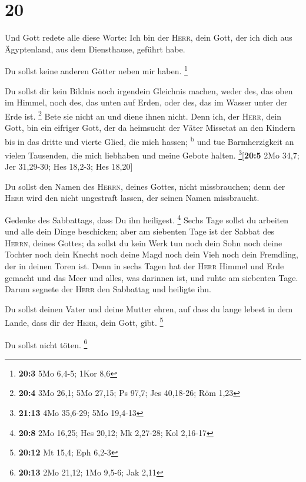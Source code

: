 \hypertarget{section-19}{%
\section{20}\label{section-19}}

 Und Gott redete alle diese Worte:  Ich bin
der \textsc{Herr}, dein Gott, der ich dich aus Ägyptenland, aus dem
Diensthause, geführt habe.

 Du sollst keine anderen Götter neben mir haben.
\footnote{\textbf{20:3} 5Mo 6,4-5; 1Kor 8,6}

 Du sollst dir kein Bildnis noch irgendein Gleichnis
machen, weder des, das oben im Himmel, noch des, das unten auf Erden,
oder des, das im Wasser unter der Erde ist. \footnote{\textbf{20:4} 3Mo
  26,1; 5Mo 27,15; Ps 97,7; Jes 40,18-26; Röm 1,23}  Bete
sie nicht an und diene ihnen nicht. Denn ich, der \textsc{Herr}, dein
Gott, bin ein eifriger Gott, der da heimsucht der Väter Missetat an den
Kindern bis in das dritte und vierte Glied, die mich hassen;
\textsuperscript{b}  und tue Barmherzigkeit an vielen
Tausenden, die mich liebhaben und meine Gebote halten.
\footnote{\textbf{21:13} 4Mo 35,6-29; 5Mo 19,4-13}{[}\textbf{20:5} 2Mo
34,7; Jer 31,29-30; Hes 18,2-3; Hes 18,20{]}

 Du sollst den Namen des \textsc{Herrn}, deines Gottes,
nicht missbrauchen; denn der \textsc{Herr} wird den nicht ungestraft
lassen, der seinen Namen missbraucht.

 Gedenke des Sabbattags, dass Du ihn heiligest.
\footnote{\textbf{20:8} 2Mo 16,25; Hes 20,12; Mk 2,27-28; Kol 2,16-17}
 Sechs Tage sollst du arbeiten und alle dein Dinge
beschicken;  aber am siebenten Tage ist der Sabbat des
\textsc{Herrn}, deines Gottes; da sollst du kein Werk tun noch dein Sohn
noch deine Tochter noch dein Knecht noch deine Magd noch dein Vieh noch
dein Fremdling, der in deinen Toren ist.  Denn in sechs
Tagen hat der \textsc{Herr} Himmel und Erde gemacht und das Meer und
alles, was darinnen ist, und ruhte am siebenten Tage. Darum segnete der
\textsc{Herr} den Sabbattag und heiligte ihn.

 Du sollst deinen Vater und deine Mutter ehren, auf dass
du lange lebest in dem Lande, dass dir der \textsc{Herr}, dein Gott,
gibt. \footnote{\textbf{20:12} Mt 15,4; Eph 6,2-3}

 Du sollst nicht töten. \footnote{\textbf{20:13} 2Mo
  21,12; 1Mo 9,5-6; Jak 2,11}

